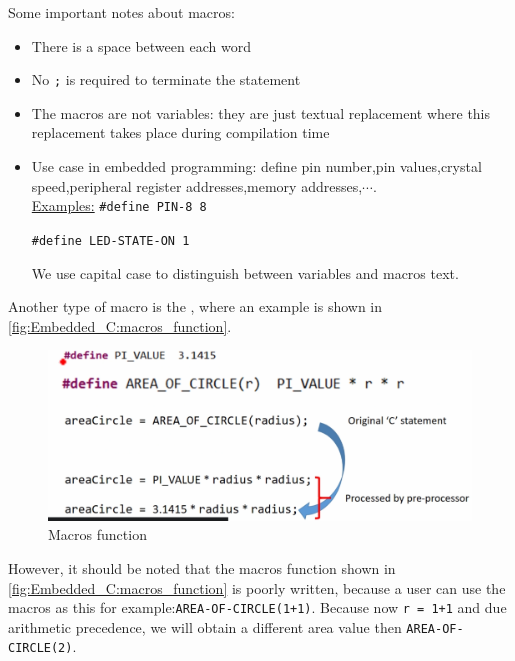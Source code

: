 Some important notes about macros:

\begin{itemize}
        \item There is a space between each word

        \item No \verb|;| is required to terminate the statement

        \item The macros are not variables: they are just textual replacement where this replacement takes place during compilation time 

        \item Use case in embedded programming: define pin number,pin values,crystal speed,peripheral register addresses,memory addresses,$\cdots$.\\

        \underline{Examples:} \verb|#define PIN-8 8|

        \verb|#define LED-STATE-ON 1|

        We use capital case to distinguish between variables and macros text.

        
    \end{itemize}


Another type of macro is the , where an example is shown in \autoref{fig:Embedded_C:macros_function}.

\begin{figure}[h]
\centering
\includegraphics[scale=0.55]{Figures/Embedded_C/macros_function}
\caption{Macros function}
\label{fig:Embedded_C:macros_function}
\end{figure}

However, it should be noted that the macros function shown in \autoref{fig:Embedded_C:macros_function}  is poorly written, because a user can use the macros as this for example:\verb|AREA-OF-CIRCLE(1+1)|.  Because now \verb|r = 1+1| and due arithmetic precedence, we will obtain a different area value then \verb|AREA-OF-CIRCLE(2)|.\\

